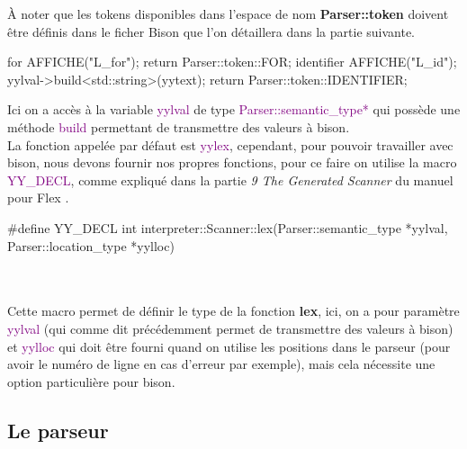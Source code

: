 \documentclass[a4paper]{article}%
\begin{document}
À noter que les tokens disponibles dans l'espace de nom \textbf{Parser::token}
doivent être définis dans le ficher Bison que l'on détaillera dans la partie
suivante.

\begin{code}
for          { AFFICHE("L_for"); return Parser::token::FOR; }
{identifier} {
  AFFICHE("L_id");
  yylval->build<std::string>(yytext);
  return Parser::token::IDENTIFIER;
}
\end{code}\leavevmode\newline

\noindent

Ici on a accès à la variable \textcolor{purple}{yylval} de type
\textcolor{purple}{Parser::semantic\_type*} qui possède une méthode
\textcolor{purple}{build} permettant de transmettre des valeurs à bison.\\


La fonction appelée par défaut est \textcolor{purple}{yylex}, cependant, pour
pouvoir travailler avec bison, nous devons fournir nos propres fonctions, pour
ce faire on utilise la macro \textcolor{purple}{YY\_DECL}, comme expliqué dans
la partie \textit{9 The Generated Scanner} du manuel pour Flex
\cite{flexmanual}.

\begin{code}
#define YY_DECL int interpreter::Scanner::lex(Parser::semantic_type *yylval, Parser::location_type *yylloc)
\end{code}\leavevmode\\~\\

Cette macro permet de définir le type de la fonction \textbf{lex}, ici,
on a pour paramètre \textcolor{purple}{yylval} (qui comme dit précédemment permet
de transmettre des valeurs à bison) et \textcolor{purple}{yylloc} qui doit être
fourni quand on utilise les positions dans le parseur (pour avoir le numéro de
ligne en cas d'erreur par exemple), mais cela nécessite une option particulière
pour bison.

\clearpage{}

\subsection{Le parseur}
\end{document}

